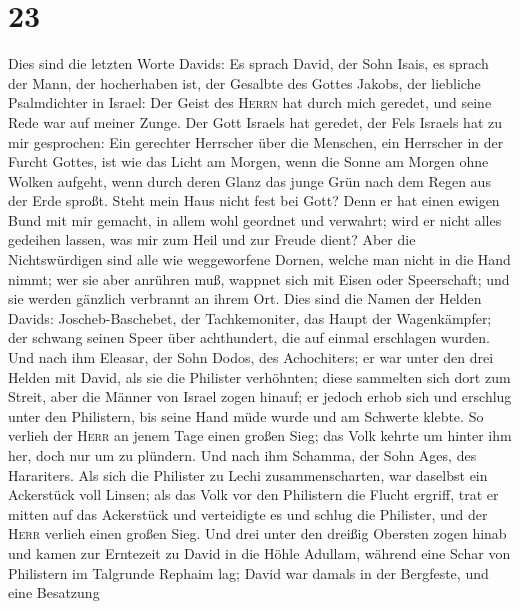 \hypertarget{section-22}{%
\section{23}\label{section-22}}

 Dies sind die letzten Worte Davids: Es sprach David, der
Sohn Isais, es sprach der Mann, der hocherhaben ist, der Gesalbte des
Gottes Jakobs, der liebliche Psalmdichter in Israel:  Der
Geist des \textsc{Herrn} hat durch mich geredet, und seine Rede war auf
meiner Zunge.  Der Gott Israels hat geredet, der Fels
Israels hat zu mir gesprochen: Ein gerechter Herrscher über die
Menschen, ein Herrscher in der Furcht Gottes,  ist wie das
Licht am Morgen, wenn die Sonne am Morgen ohne Wolken aufgeht, wenn
durch deren Glanz das junge Grün nach dem Regen aus der Erde sproßt.
 Steht mein Haus nicht fest bei Gott? Denn er hat einen
ewigen Bund mit mir gemacht, in allem wohl geordnet und verwahrt; wird
er nicht alles gedeihen lassen, was mir zum Heil und zur Freude dient?
 Aber die Nichtswürdigen sind alle wie weggeworfene
Dornen, welche man nicht in die Hand nimmt;  wer sie aber
anrühren muß, wappnet sich mit Eisen oder Speerschaft; und sie werden
gänzlich verbrannt an ihrem Ort.  Dies sind die Namen der
Helden Davids: Joscheb-Baschebet, der Tachkemoniter, das Haupt der
Wagenkämpfer; der schwang seinen Speer über achthundert, die auf einmal
erschlagen wurden.  Und nach ihm Eleasar, der Sohn Dodos,
des Achochiters; er war unter den drei Helden mit David, als sie die
Philister verhöhnten; diese sammelten sich dort zum Streit, aber die
Männer von Israel zogen hinauf;  er jedoch erhob sich und
erschlug unter den Philistern, bis seine Hand müde wurde und am Schwerte
klebte. So verlieh der \textsc{Herr} an jenem Tage einen großen Sieg;
das Volk kehrte um hinter ihm her, doch nur um zu plündern.
 Und nach ihm Schamma, der Sohn Ages, des Harariters. Als
sich die Philister zu Lechi zusammenscharten, war daselbst ein
Ackerstück voll Linsen; als das Volk vor den Philistern die Flucht
ergriff,  trat er mitten auf das Ackerstück und
verteidigte es und schlug die Philister, und der \textsc{Herr} verlieh
einen großen Sieg.  Und drei unter den dreißig Obersten
zogen hinab und kamen zur Erntezeit zu David in die Höhle Adullam,
während eine Schar von Philistern im Talgrunde Rephaim lag;
 David war damals in der Bergfeste, und eine Besatzung
